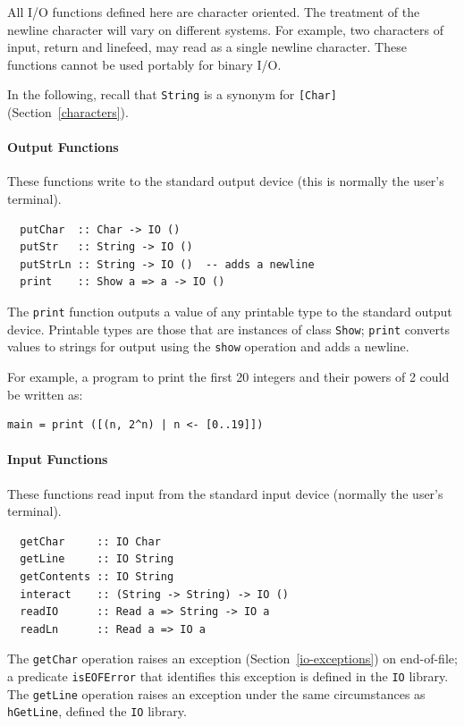 All I/O functions defined here are character oriented.  The treatment
of the newline character will vary on different systems.  For example,
two characters of input, return and linefeed, may read as a single
newline character.  These functions cannot be used portably for binary
I/O.

In the following, recall that \mbox{\tt String} is a synonym for \mbox{\tt [Char]} (Section~\ref{characters}).

\paragraph*{Output Functions}
These functions write to the standard output device (this is normally
the user's terminal). 
\bprog
{\small\begin{verbatim}
  putChar  :: Char -> IO ()
  putStr   :: String -> IO ()
  putStrLn :: String -> IO ()  -- adds a newline
  print    :: Show a => a -> IO ()
\end{verbatim}}
\eprog
{}
The \mbox{\tt print} function outputs a value of any printable type to the
standard output device.
Printable types are those that are instances of class \mbox{\tt Show}; \mbox{\tt print}
converts values to strings for output using the \mbox{\tt show} operation and
adds a newline.


For example, a program to print the first 20 integers and their
powers of 2 could be written as:
\bprog
{\small\begin{verbatim}
main = print ([(n, 2^n) | n <- [0..19]])
\end{verbatim}}
\eprog

\paragraph*{Input Functions}
These functions read input from the standard input device (normally
the user's terminal).
\bprog
{\small\begin{verbatim}
  getChar     :: IO Char
  getLine     :: IO String
  getContents :: IO String
  interact    :: (String -> String) -> IO ()
  readIO      :: Read a => String -> IO a
  readLn      :: Read a => IO a
\end{verbatim}}
\eprog
{}%
%
%
%
%
%
The \mbox{\tt getChar} operation raises an exception (Section~\ref{io-exceptions}) on end-of-file; a 
predicate \mbox{\tt isEOFError} that identifies this exception is defined in the \mbox{\tt IO} library.
The \mbox{\tt getLine} operation raises an exception under the same circumstances as \mbox{\tt hGetLine}, 
defined the \mbox{\tt IO} library.

